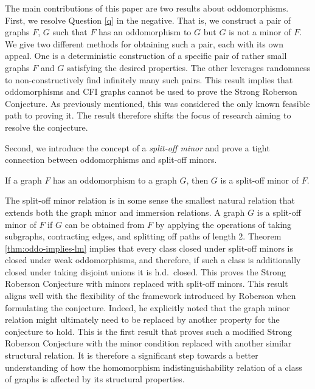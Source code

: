 \documentclass[11pt]{article}
\begin{document}
The main contributions of this paper are two results about oddomorphisms. 
First, we resolve Question \ref{q} in the negative. 
That is, we construct a pair of graphs $F$, $G$ such that $F$ has an oddomorphism to $G$ but $G$ is not a minor of $F$.
We give two different methods for obtaining such a pair, each with its own appeal. One is a deterministic construction of a specific pair of rather small graphs $F$ and $G$ satisfying the desired properties. The other leverages randomness to non-constructively find infinitely many such pairs.
This result implies that oddomorphisms and CFI graphs cannot be used to prove the Strong Roberson Conjecture. As previously mentioned, this was considered the only known feasible path to proving it.
The result therefore shifts the focus of research aiming to resolve the conjecture.
\par 
Second, we introduce the concept of a \emph{split-off minor} and prove a tight connection between oddomorphisms and split-off minors.
\begin{theorem}
\label{thm:oddo-implies-lm}
    If a graph $F$ has an oddomorphism to a graph $G$, then $G$ is a split-off minor of $F$.
\end{theorem}
The split-off minor relation is in some sense the smallest natural relation that extends both the graph minor and immersion relations. 
A graph $G$ is a split-off minor of $F$ if $G$ can be obtained from $F$ by applying the operations of taking subgraphs, contracting edges, and splitting off paths of length 2.
Theorem \ref{thm:oddo-implies-lm} implies that every class closed under split-off minors is closed under weak oddomorphisms, and therefore, if such a class is additionally closed under taking disjoint unions it is h.d.\ closed.
This proves the Strong Roberson Conjecture with minors replaced with split-off minors.
This result aligns well with the flexibility of the framework introduced by Roberson when formulating the conjecture. Indeed, he explicitly noted that the graph minor relation might ultimately need to be replaced by another property for the conjecture to hold.
This is the first result that proves such a modified Strong Roberson Conjecture with the minor condition replaced with another similar structural relation. It is therefore a significant step towards a better understanding of how the homomorphism indistinguishability relation of a class of graphs is affected by its structural properties.
\end{document}
